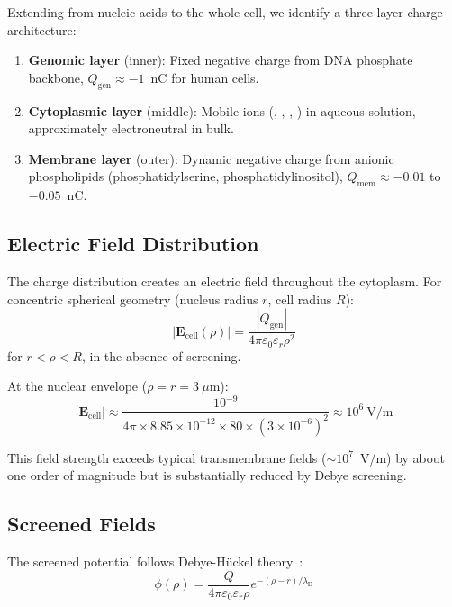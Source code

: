 \documentclass[twocolumn,aps,prb,superscriptaddress,longbibliography,floatfix]{revtex4-2}
\theoremstyle{remark}
\newcommand{\Qgen}{Q_\text{gen}}
\newcommand{\Qmem}{Q_\text{mem}}
\newcommand{\lambdaD}{\lambda_\text{D}}
\newcommand{\Ecell}{\mathbf{E}_\text{cell}}
\begin{document}
Extending from nucleic acids to the whole cell, we identify a
three-layer charge architecture:

\begin{enumerate}
    \item \textbf{Genomic layer} (inner): Fixed negative charge from DNA
    phosphate backbone, $\Qgen \approx -1$~nC for human cells.

    \item \textbf{Cytoplasmic layer} (middle): Mobile ions
    (, , , ) in aqueous solution,
    approximately electroneutral in bulk.

    \item \textbf{Membrane layer} (outer): Dynamic negative charge from
    anionic phospholipids (phosphatidylserine, phosphatidylinositol),
    $\Qmem \approx -0.01$ to $-0.05$~nC.
\end{enumerate}

\subsection{Electric Field Distribution}

The charge distribution creates an electric field throughout the
cytoplasm. For concentric spherical geometry (nucleus radius $r$,
cell radius $R$):
\begin{equation}
|\Ecell(\rho)| = \frac{|\Qgen|}{4\pi\varepsilon_0\varepsilon_r\rho^2}
\end{equation}
for $r < \rho < R$, in the absence of screening.

At the nuclear envelope ($\rho = r = 3~\mu$m):
\begin{equation}
|\Ecell| \approx \frac{10^{-9}}{4\pi \times 8.85 \times 10^{-12} \times 80 \times (3 \times 10^{-6})^2} \approx 10^6~\text{V/m}
\end{equation}

This field strength exceeds typical transmembrane fields
($\sim 10^7$~V/m) by about one order of magnitude but is substantially
reduced by Debye screening.

\subsection{Screened Fields}

The screened potential follows Debye-H\"{u}ckel theory~\cite{Debye1923}:
\begin{equation}
\phi(\rho) = \frac{Q}{4\pi\varepsilon_0\varepsilon_r\rho} e^{-(\rho-r)/\lambdaD}
\end{equation}
\end{document}
